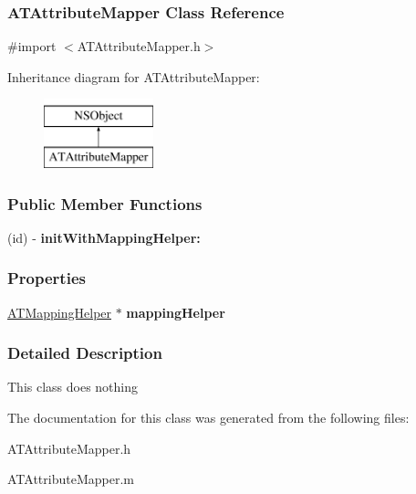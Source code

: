 \hypertarget{interface_a_t_attribute_mapper}{
\subsubsection{ATAttributeMapper Class Reference}
\label{interface_a_t_attribute_mapper}
}


{\ttfamily \#import $<$ATAttributeMapper.h$>$}

Inheritance diagram for ATAttributeMapper:\begin{figure}[h]
\begin{center}
\leavevmode
\includegraphics[height=2.000000cm]{interface_a_t_attribute_mapper}
\end{center}
\end{figure}
\subsubsection*{Public Member Functions}
\begin{DoxyCompactItemize}
\item 
\hypertarget{interface_a_t_attribute_mapper_ae1724904b0f49669626c87f07b4e0fd2}{
(id) -\/ {\bfseries initWithMappingHelper:}}
\label{interface_a_t_attribute_mapper_ae1724904b0f49669626c87f07b4e0fd2}

\end{DoxyCompactItemize}
\subsubsection*{Properties}
\begin{DoxyCompactItemize}
\item 
\hypertarget{interface_a_t_attribute_mapper_a2b8e7175248e56bbe8cd2217e23e9220}{
\hyperlink{interface_a_t_mapping_helper}{ATMappingHelper} $\ast$ {\bfseries mappingHelper}}
\label{interface_a_t_attribute_mapper_a2b8e7175248e56bbe8cd2217e23e9220}

\end{DoxyCompactItemize}


\subsubsection{Detailed Description}
This class does nothing 

The documentation for this class was generated from the following files:\begin{DoxyCompactItemize}
\item 
ATAttributeMapper.h\item 
ATAttributeMapper.m\end{DoxyCompactItemize}

